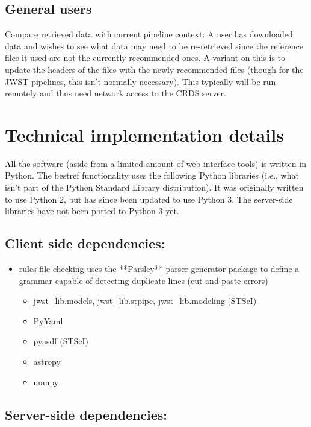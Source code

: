 \documentclass[final,authoryear,5p,times,twocolumn]{elsarticle}
\begin{document}
\subsection{General users}

Compare retrieved data with current pipeline context: A user has downloaded
data and wishes to see what data may need to be re-retrieved since the
reference files it used are not the currently recommended ones. A variant on
this is to update the headers of the files with the newly recommended files
(though for the JWST pipelines, this isn't normally necessary). This typically
will be run remotely and thus need network access to the CRDS server.

\section{Technical implementation details}

All the software (aside from a limited amount of web interface tools) is
written in Python. The bestref functionality uses the following Python
libraries (i.e., what isn't part of the Python Standard Library
distribution). It was originally written to use Python 2, but has since been
updated to use Python 3. The server-side libraries have not been ported to 
Python 3 yet.

\subsection{Client side dependencies:}

\begin{itemize}
\item rules file checking uses the **Parsley** parser generator package to define a grammar capable of detecting duplicate lines (cut-and-paste errors)
  \begin{itemize}
  \item jwst\_lib.models, jwst\_lib.stpipe, jwst\_lib.modeling (STScI)
  \item PyYaml
  \item pyasdf (STScI)
  \item astropy
  \item numpy
  \end{itemize}
\end{itemize}

\subsection{Server-side dependencies:}
\end{document}
